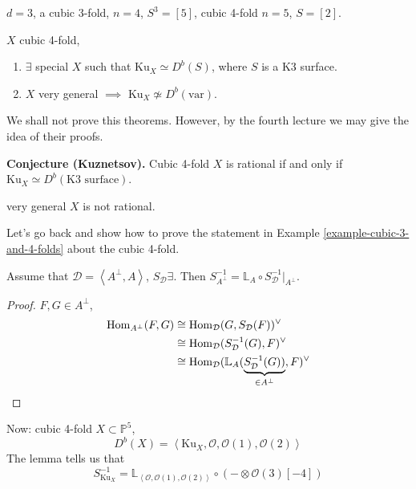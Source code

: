 \begin{example}
\label{example-cubic-3-and-4-folds}
$d=3$, a cubic 3-fold,  $n=4$,  $S^3=[5]$, cubic 4-fold $n=5$,  $S=[2]$.
\end{example}

\begin{theorem}[Kuznetsov]
\label{theorem-Kuznetsov-2}
$X$ cubic 4-fold,
\begin{enumerate}
\item $\exists $ special $X$ such that $\text{Ku}_X \simeq D^b(S)$, where $S$ is
a K3 surface.
\item $X$ very general $\implies$ $\text{Ku}_X \not \simeq D^b(\text{var})$.
\end{enumerate}
\end{theorem}

We shall not prove this theorems. However, by the fourth lecture we may give the
idea of their proofs.

\medskip\noindent
{\bf Conjecture (Kuznetsov).} Cubic 4-fold $X$ is rational if and only if
$\text{Ku}_X \simeq D^b(\text{K3 surface})$.

\medskip\noindent
[KKPY] very general $X$ is not rational.

\medskip\noindent
Let's go back and show how to prove the statement in Example
\ref{example-cubic-3-and-4-folds} about
the cubic 4-fold.

\begin{lemma}
\label{lemma-cubic-4-fold}
Assume that $\mathcal{D}=\left<A^{\perp},A\right>$, $S_{\mathcal{D}}\exists $.
Then 
$S^{-1}_{A^\perp}=\mathbb{L}_A\circ S^{-1}_{\mathcal{D}}|_{A^\perp}$.
\end{lemma}

\begin{proof}
$F,G \in A^\perp$,
\begin{align*}
\mathop{\mathrm{Hom}}\nolimits_{A^\perp}(F,G)
&\cong\mathop{\mathrm{Hom}}\nolimits_{\mathcal{D}}(G,S_{\mathcal{D}}(F))^\vee\\
&\cong\mathop{\mathrm{Hom}}\nolimits_{\mathcal{D}}(S^{-1}_{\mathcal{D}}(G),F)^\vee\\
&\cong \mathop{\mathrm{Hom}}\nolimits_{\mathcal{D}}(\mathbb{L}_A(\underbrace{S^{-1}_{\mathcal{D}}(G))}
_{\in A^\perp},F)^\vee
\end{align*}
\end{proof}

Now: cubic 4-fold $X \subset \mathbb{P}^5$,
$$
D^b(X)=\left<\text{Ku}_X,\mathcal{O},\mathcal{O}(1),\mathcal{O}(2)\right>
$$
The lemma tells us that
$$
S_{\text{Ku}_X}^{-1}
=\mathbb{L}_{\left<\mathcal{O},\mathcal{O}(1),\mathcal{O}(2)\right>}
\circ (- \otimes \mathcal{O}(3)[-4])
$$

